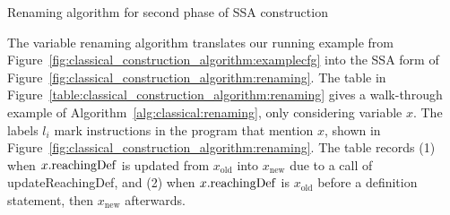 {\begin{algorithm}
\caption{\label{alg:classical:renaming}Renaming algorithm for second
  phase of SSA construction}
\end{algorithm}

The variable renaming algorithm translates our running example 
from Figure~\ref{fig:classical_construction_algorithm:examplecfg}
into the SSA form of Figure~\ref{fig:classical_construction_algorithm:renaming}. 
The table in Figure~\ref{table:classical_construction_algorithm:renaming} 
gives a walk-through example of Algorithm~\ref{alg:classical:renaming},
only considering variable $x$. The labels $l_i$ mark
instructions in the program that mention $x$, shown in 
Figure~\ref{fig:classical_construction_algorithm:renaming}.
The table records (1) when $x.\mathrm{reachingDef}$ is updated
from $x_\mathrm{old}$ into
$x_\mathrm{new}$ due to a call of updateReachingDef,
and (2) when $x.\mathrm{reachingDef}$ is $x_\mathrm{old}$ before
a definition statement, then $x_\mathrm{new}$ afterwards.

}
